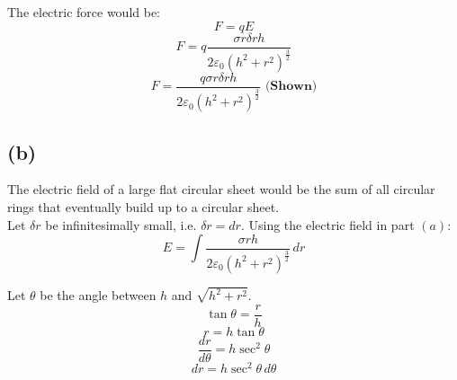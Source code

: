 \documentclass[11pt]{article}
\begin{document}
\newpage

The electric force would be:
\[F = qE\]
\[F = q \frac{\sigma r \delta r h}{2 \varepsilon_0 (h^2 + r^2)^{\frac{3}{2}}}\]
\[F = \frac{q \sigma r \delta r h}{2 \varepsilon_0 (h^2 + r^2)^{\frac{3}{2}}} \textbf{ (Shown)}\]

\subsection{(b)}
\label{sec:orgd256e5e}
The electric field of a large flat circular sheet would be the sum of all circular rings that eventually build up to a circular sheet.
\\[0pt]

Let \(\delta r\) be infinitesimally small, i.e. \(\delta r = dr\). Using the electric field in part \((a)\):
\[E = \int \frac{\sigma r h}{2 \varepsilon_0 (h^2 + r^2)^{\frac{3}{2}}} \, dr\]

Let \(\theta\) be the angle between \(h\) and \(\sqrt{h^2 + r^2}\).
\[\tan \theta = \frac{r}{h}\]
\[r = h \tan \theta\]
\[\frac{dr}{d \theta} = h \sec^2 \theta\]
\[dr = h \sec^2 \theta \, d \theta\]
\end{document}
